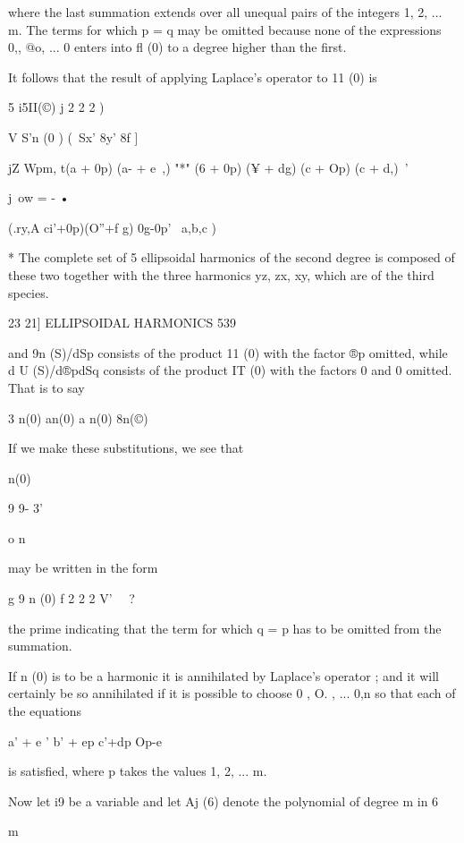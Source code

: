 where the last summation extends over all unequal pairs of the integers 
1, 2, ... m. The terms for which p = q may be omitted because none of the 
expressions 0,, @o, ... 0  enters into fl (0) to a degree higher than the first. 

It follows that the result of applying Laplace's operator to 11 (0) is 

5 i5II(©) j 2 2 2 ) 

V S'n (0 ) (\  Sx' 8y' 8f ] 

  jZ  Wpm, t(a  + 0p) (a-  + e~,) "*" (6  + 0p) (¥ + dg)   (c  + Op) (c  + d,)\ ' 

j\ ow     = -   • 

(.ry,A ci'+0p)(O''+f g) 0g-0p' 
\ a,b,c ) 

* The complete set of 5 ellipsoidal harmonics of the second degree is composed of these two 
together with the three harmonics yz, zx, xy, which are of the third species. 



23 21] ELLIPSOIDAL HARMONICS 539 

and 9n (S)/dSp consists of the product 11 (0) with the factor ®p omitted, 
while d U (S)/d®pdSq consists of the product IT (0) with the factors 0  and 
0  omitted. That is to say 

3 n(0)  an(0) a n(0) 8n(©) 



If we make these substitutions, we see that 

n(0) 



9  9- 3' 



 o n 



may be written in the form 

g 9 n (0) f 2 2 2 V' \ \ ?\  

the prime indicating that the term for which q = p has to be omitted from 
the summation. 

If n (0) is to be a harmonic it is annihilated by Laplace's operator ; and 
it will certainly be so annihilated if it is possible to choose 0  , O. , ... 0,n so 
that each of the equations 

a' + e '  b' + ep   c'+dp  Op-e  

is satisfied, where p takes the values 1, 2, ... m. 

Now let i9 be a variable and let Aj (6) denote the polynomial of degree 
m in 6 

m 

